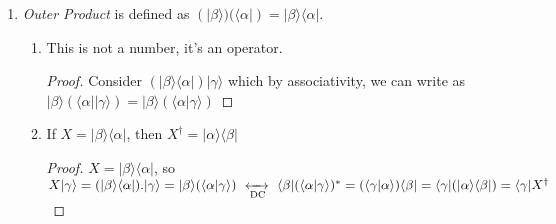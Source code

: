 \documentclass[12pt]{article}
\def\dc{\,\,\xleftrightarrow[\text{DC}]{}\,\,}
\def\bra#1{\langle#1|}
\def\ket#1{|#1 \rangle}
\def\inpr#1#2{\langle #1|#2 \rangle}
\def\ha#1{#1^\dagger}
\begin{document}
\begin{enumerate}
\begin{enumerate}
							\begin{proof}
							\begin{multline*}
								\text{We know}\;
								 		(XY)\ket \alpha \dc \bra \alpha \ha{(XY)} \\
								\shoveleft{\text{We also know}\;
								 	(Y\ket \alpha) \dc (\bra \alpha \ha Y)} \\
								\shoveleft{\text{Let}\;
												Y\ket\alpha = \ket \beta } \\
								\shoveleft{\Rightarrow			Y\ket\alpha = \ket \beta \dc \bra \beta = \bra \alpha \ha Y} \\
								\shoveleft{\text{Then}\;
											X\ket \beta \dc \bra \beta \ha X }\\
								\shoveleft{\Rightarrow			XY \ket \alpha \dc \bra \alpha \ha Y \ha X}\\
							\end{multline*}
							\end{proof}
						\end{enumerate}
					\item \emph{Outer Product} is defined as $(\ket \beta) (\bra \alpha) = \ket \beta \bra \alpha$.
						\begin{enumerate}
							\item This is not a number, it's an operator.
							\begin{proof}
							Consider $(\ket \beta \bra \alpha) \ket \gamma $ which by associativity, we can write as\\
							 $\ket \beta (\bra \alpha \ket \gamma) = \ket \beta (\inpr{\alpha}{\gamma})$
							\end{proof}
							\item If $X=\ket \beta \bra \alpha$, then $\ha X = \ket \alpha \bra \beta$
							\begin{proof}
								$X=\ket \beta \bra \alpha$, so\\
								$X\ket \gamma = (\ket \beta \bra \alpha).\ket \gamma = \ket \beta (\inpr{\alpha}{\gamma}) \dc \bra \beta (\inpr{\alpha}{\gamma})^* = (\inpr{\gamma}{\alpha})\bra \beta = \bra \gamma (\ket \alpha \bra \beta) = \bra \gamma \ha X$
							\end{proof}


\end{enumerate}
\end{enumerate}
\end{document}
